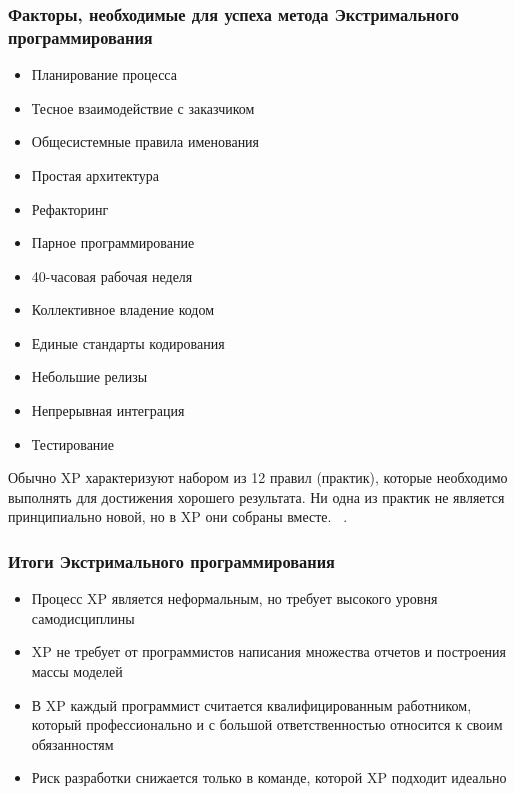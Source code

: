 \documentclass{../industrial-development}
\begin{document}
\begin{frame} \frametitle{Факторы, необходимые для успеха метода Экстримального программирования}
	\begin{itemize}
		\item Планирование процесса
		\item Тесное взаимодействие с заказчиком
		\item Общесистемные правила именования
		\item Простая архитектура
		\item Рефакторинг
		\item Парное программирование 
		\item 40-часовая рабочая неделя
		\item Коллективное владение кодом
		\item Единые стандарты кодирования
		\item Небольшие релизы
		\item Непрерывная интеграция
		\item Тестирование
	\end{itemize}	
\end{frame}

\lecturenotes
Обычно XP характеризуют набором из 12 правил (практик), которые необходимо выполнять для достижения хорошего результата. Ни одна из практик не является принципиально новой, но в XP они собраны вместе. 
~\cite{Fowler}.


\begin{frame} \frametitle{Итоги Экстримального программирования}
	\begin{itemize}
		\item Процесс XP является неформальным, но требует высокого уровня самодисциплины 
		\item XP не требует от программистов написания множества отчетов и построения массы моделей 
		\item В XP каждый программист считается квалифицированным работником, который профессионально и с большой ответственностью относится к своим обязанностям
		\item Риск разработки снижается только в команде, которой XP подходит идеально
	\end{itemize}	
\end{frame}
\end{document}

